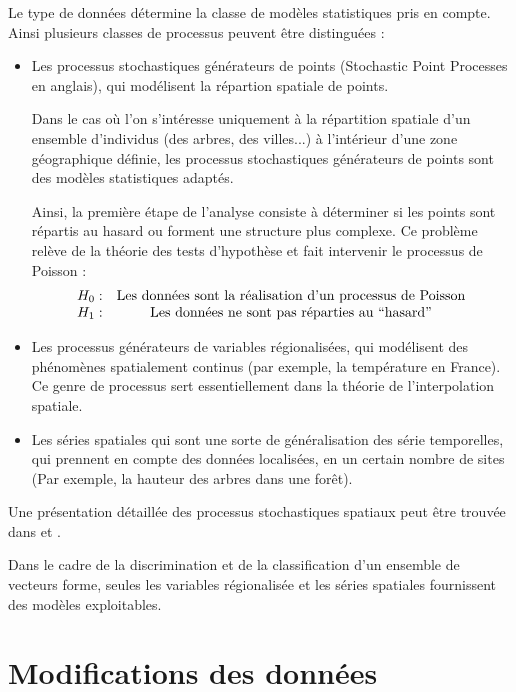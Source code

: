Le type de donn\'ees d\'etermine la classe de mod\`eles statistiques pris
en compte. Ainsi plusieurs classes de processus peuvent \^etre distingu\'ees :
\begin{itemize}
\item Les processus stochastiques g\'en\'erateurs de points (Stochastic Point Processes
en anglais), qui mod\'elisent la r\'epartion spatiale de points.
\begin{ex}
Dans le cas o\`u l'on s'int\'eresse uniquement \`a la r\'epartition
spatiale d'un ensemble d'individus (des arbres, des villes...) \`a
l'int\'erieur d'une zone g\'eographique d\'efinie, les processus stochastiques
g\'en\'erateurs de points  sont des mod\`eles statistiques adapt\'es.

Ainsi, la premi\`ere \'etape de l'analyse consiste \`a d\'eterminer si les 
points sont r\'epartis au hasard ou forment une structure plus complexe.
Ce probl\`eme rel\`eve de la th\'eorie des tests d'hypoth\`ese et fait
intervenir le processus de Poisson :
\[
\begin{array}{c c}
H_0: & \mbox{Les donn\'ees sont la r\'ealisation d'un processus de Poisson} \\
H_1: & \mbox{Les donn\'ees ne sont pas r\'eparties au ``hasard''}
\end{array} 
\]
\end{ex}

\item Les processus g\'en\'erateurs de variables r\'egionalis\'ees, qui 
mod\'elisent des ph\'enom\`enes spatialement continus (par exemple, 
la temp\'erature en France). Ce genre de processus sert essentiellement
dans la th\'eorie de l'interpolation spatiale.
\item Les s\'eries spatiales qui sont une sorte de g\'en\'eralisation 
des s\'erie temporelles, qui prennent en compte des donn\'ees localis\'ees,
en un certain nombre de sites (Par exemple, la hauteur des arbres dans une for\^et).
\end{itemize} 

Une pr\'esentation d\'etaill\'ee des processus stochastiques 
spatiaux peut \^etre trouv\'ee dans 
et .     

Dans le cadre de la discrimination et de la classification d'un ensemble
de vecteurs forme,  seules  les  variables  r\'egionalis\'ee et les  
s\'eries spatiales fournissent des mod\`eles exploitables.


\section{Modifications des donn\'ees}
